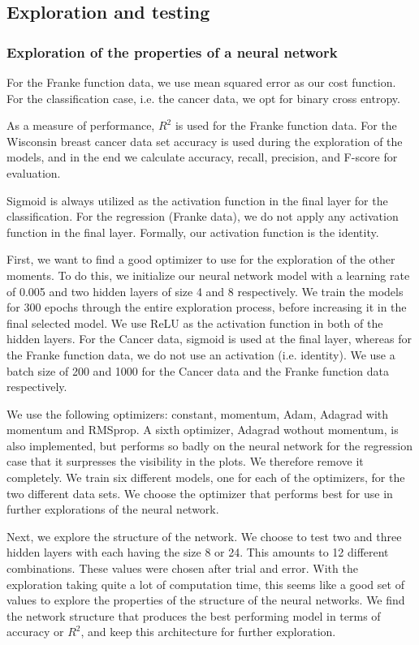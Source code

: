 \subsection{Exploration and testing}
\subsubsection{Exploration of the properties of a neural network}

For the Franke function data, we use mean squared error as our cost function. For the classification case, i.e. the cancer data, we opt for binary cross entropy.

As a measure of performance, $R^2$ is used for the Franke function data. For the Wisconsin breast cancer data set accuracy is used during the exploration of the models, and in the end we calculate accuracy, recall, precision, and F-score for evaluation. 

Sigmoid is always utilized as the activation function in the final layer for the classification. 
For the regression (Franke data), we do not apply any activation function in the final layer.
Formally, our activation function is the identity.

First, we want to find a good optimizer to use for the exploration of the other moments. 
To do this, we initialize our neural network model with a learning rate of 0.005 and two hidden layers of size 4 and 8 respectively. 
We train the models for 300 epochs through the entire exploration process, before increasing it in the final selected model. 
We use ReLU as the activation function in both of the hidden layers.
For the Cancer data, sigmoid is used at the final layer, whereas for the Franke function data, we do not use an activation (i.e. identity). 
We use a batch size of 200 and 1000 for the Cancer data and the Franke function data respectively.

We use the following optimizers: constant, momentum, Adam, Adagrad with momentum and RMSprop. 
A sixth optimizer, Adagrad wothout momentum, is also implemented, but performs so badly on the neural network for the regression case that it surpresses the visibility in the plots. 
We therefore remove it completely. 
We train six different models, one for each of the optimizers, for the two different data sets. 
We choose the optimizer that performs best for use in further explorations of the neural network. 

Next, we explore the structure of the network. We choose to test two and three hidden layers with each having the size 8 or 24. 
This amounts to 12 different combinations. 
These values were chosen after trial and error.
With the exploration taking quite a lot of computation time, this seems like a good set of values to explore the properties of the structure of the neural networks. 
We find the network structure that produces the best performing model in terms of accuracy or $R^2$, and keep this architecture for further exploration. 

